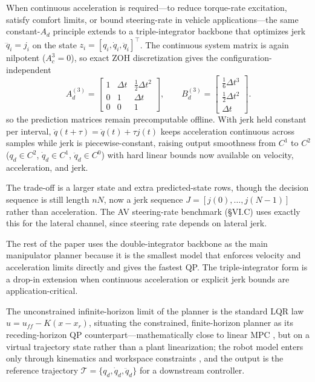 When continuous acceleration is required---to reduce torque-rate
excitation, satisfy comfort limits, or bound steering-rate in vehicle
applications---the same constant-\(A_d\) principle extends to a
triple-integrator backbone that optimizes jerk \(\dddot q_i = j_i\) on the
state \(z_i=[q_i,\dot q_i,\ddot q_i]^\top\). The continuous system matrix
is again nilpotent (\(A_c^3=0\)), so exact ZOH discretization gives the
configuration-independent
\begin{equation}
\label{eq:triple-zoh}
A_d^{(3)} =
\begin{bmatrix}
1&\Delta t&\tfrac{1}{2}\Delta t^2\\
0&1&\Delta t\\
0&0&1
\end{bmatrix},
\qquad
B_d^{(3)} =
\begin{bmatrix}
\tfrac{1}{6}\Delta t^3\\
\tfrac{1}{2}\Delta t^2\\
\Delta t
\end{bmatrix}.
\end{equation}
so the prediction matrices remain precomputable offline. With jerk held
constant per interval, \(\ddot q(t+\tau)=\ddot q(t)+\tau j(t)\) keeps
acceleration continuous across samples while jerk is piecewise-constant,
raising output smoothness from \(C^1\) to \(C^2\) (\(q_d\in C^2\),
\(\dot q_d\in C^1\), \(\ddot q_d\in C^0\)) with hard linear bounds now
available on velocity, acceleration, and jerk.

The trade-off is a larger state and extra predicted-state rows, though the
decision sequence is still length \(nN\), now a jerk sequence
\(J=[j(0),\dots,j(N-1)]\) rather than acceleration. The AV steering-rate
benchmark (§VI.C) uses exactly this for the lateral channel, since steering
rate depends on lateral jerk.

The rest of the paper uses the double-integrator backbone as the main
manipulator planner because it is the smallest model that enforces
velocity and acceleration limits directly and gives the fastest QP. The
triple-integrator form is a drop-in extension when continuous
acceleration or explicit jerk bounds are application-critical.

The unconstrained infinite-horizon limit of the planner is the standard LQR
law \(u=u_{ff}-K(x-x_r)\), situating the constrained, finite-horizon planner
as its receding-horizon QP counterpart---mathematically close to linear MPC
\cite{mayne2000}, but on a virtual trajectory state rather than a plant
linearization; the robot model enters only through kinematics and workspace
constraints \cite{khatib1987}, and the output is the reference trajectory
\(\mathcal T=\{q_d,\dot q_d,\ddot q_d\}\) for a downstream controller.

